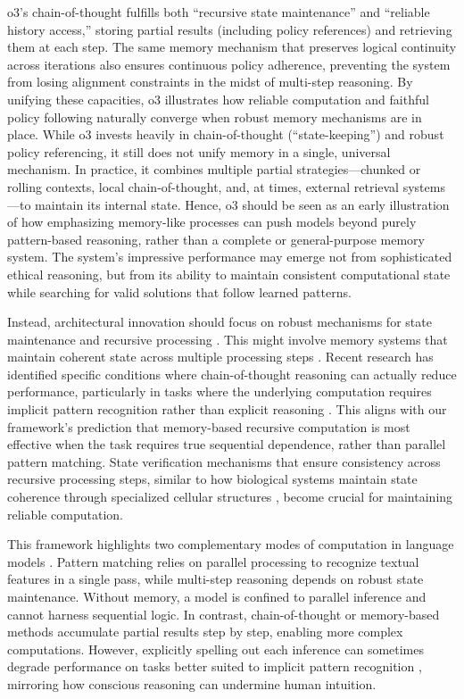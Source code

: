 \documentclass[12pt]{article}
\begin{document}
o3's chain-of-thought fulfills both ``recursive state maintenance'' and ``reliable history access,'' storing partial results (including policy references) and retrieving them at each step.
The same memory mechanism that preserves logical continuity across iterations also ensures continuous policy adherence, preventing the system from losing alignment constraints in the midst of multi-step reasoning.
By unifying these capacities, o3 illustrates how reliable computation and faithful policy following naturally converge when robust memory mechanisms are in place.
While o3 invests heavily in chain-of-thought (``state-keeping'') and robust policy referencing, it still does not unify memory in a single, universal mechanism.
In practice, it combines multiple partial strategies---chunked or rolling contexts, local chain-of-thought, and, at times, external retrieval systems---to maintain its internal state.
Hence, o3 should be seen as an early illustration of how emphasizing memory-like processes can push models beyond purely pattern-based reasoning, rather than a complete or general-purpose memory system.
The system's impressive performance may emerge not from sophisticated ethical reasoning, but from its ability to maintain consistent computational state while searching for valid solutions that follow learned patterns.

Instead, architectural innovation should focus on robust mechanisms for state maintenance and recursive processing \cite{jung2020new}.
This might involve memory systems that maintain coherent state across multiple processing steps \cite{zhu2024overcoming}.
Recent research has identified specific conditions where chain-of-thought reasoning can actually reduce performance, particularly in tasks where the underlying computation requires implicit pattern recognition rather than explicit reasoning \cite{liu2024mind}.
This aligns with our framework's prediction that memory-based recursive computation is most effective when the task requires true sequential dependence, rather than parallel pattern matching.
State verification mechanisms that ensure consistency across recursive processing steps, similar to how biological systems maintain state coherence through specialized cellular structures \cite{espinosa2024molecular}, become crucial for maintaining reliable computation.


This framework highlights two complementary modes of computation in language models \cite{wei2022chain}.
Pattern matching relies on parallel processing to recognize textual features in a single pass, while multi-step reasoning depends on robust state maintenance.
Without memory, a model is confined to parallel inference and cannot harness sequential logic.
In contrast, chain-of-thought or memory-based methods accumulate partial results step by step, enabling more complex computations.
However, explicitly spelling out each inference can sometimes degrade performance on tasks better suited to implicit pattern recognition \cite{liu2024mind}, mirroring how conscious reasoning can undermine human intuition.
\end{document}

